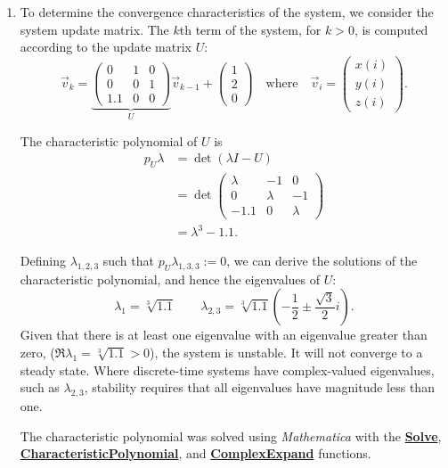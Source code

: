 \documentclass{article}
\newcommand\mma[1]%
    {\href{https://reference.wolfram.com/language/ref/#1.html}{\textbf{#1}}}
\numberwithin{equation}{section}
\numberwithin{table}{section}
\numberwithin{figure}{section}
\begin{document}
\begin{enumerate}
\begin{enumerate}
        \item To determine the convergence characteristics of the system, we
        consider the system update matrix. The $k$th term of the system, for $k
        > 0$, is computed according to the update matrix $U$:
        \begin{equation}
            \vec{v}_k = \underbrace{\begin{pmatrix}
                0 & 1 & 0 \\
                0 & 0 & 1 \\
                1.1 & 0 & 0 \end{pmatrix}}_U \vec{v}_{k-1} +
            \begin{pmatrix} 1 \\ 2 \\ 0 \end{pmatrix}\quad \text{where}\quad
            \vec{v}_i = \begin{pmatrix}
                x(i) \\ y(i) \\ z(i)
            \end{pmatrix}.
        \end{equation}

        The characteristic polynomial of $U$ is
        \begin{align}
            p_U\lambda &= \det{(\lambda I - U)} \\
            &= \det{\begin{pmatrix}
                    \lambda & -1 & 0 \\
                    0 & \lambda & -1 \\
                    -1.1 & 0 & \lambda
                \end{pmatrix}} \\
            &= \lambda^3 - 1.1.
        \end{align}

        Defining $\lambda_{1,2,3}$ such that $p_U\lambda_{1,3,3} := 0$, we can
        derive the solutions of the characteristic polynomial, and hence the
        eigenvalues of $U$:
        \begin{equation}
            \lambda_1 = \sqrt[3]{1.1} \qquad
            \lambda_{2,3} = \sqrt[3]{1.1}\left( -\frac{1}{2} \pm
                \frac{\sqrt{3}}{2}i \right).
        \end{equation}
        Given that there is at least one eigenvalue with an eigenvalue greater
        than zero, ($\Re{\lambda_1} = \sqrt[3]{1.1} > 0$), the system is
        unstable. It will not converge to a steady state. Where discrete-time
        systems have complex-valued eigenvalues, such as $\lambda_{2,3}$,
        stability requires that all eigenvalues have magnitude less than one.

        The characteristic polynomial was solved using \emph{Mathematica} with
        the \mma{Solve}, \mma{CharacteristicPolynomial}, and \mma{ComplexExpand}
        functions.
    \end{enumerate}
\end{enumerate}
\end{document}
